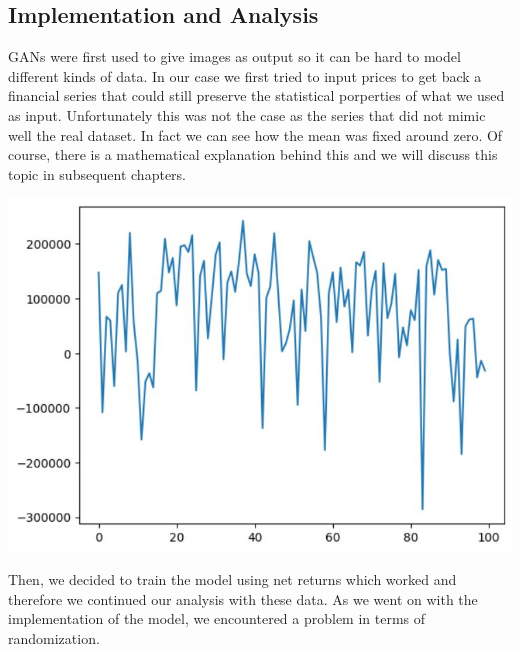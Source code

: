 \documentclass{article}
\begin{document}
\begin{multicols}{2}
    \subsection*{Implementation and Analysis}
    GANs were first used to give images as output so it can be hard to model different kinds of data. In our case we first tried to input prices to get back a financial series that could still preserve the statistical porperties of what we used as input. Unfortunately this was not the case as the series that did not mimic well the real dataset. In fact we can see how the mean was fixed around zero. Of course, there is a mathematical explanation behind this and we will discuss this topic in subsequent chapters.\\
    
    \begin{center}
        \includegraphics[scale = 0.3]{imgs/elisa/price.jpg}
    \end{center}

    Then, we decided to train the model using net returns which worked and therefore we continued our analysis with these data. As we went on with the implementation of the model, we encountered a problem in terms of randomization.\\


\end{multicols}
\end{document}
